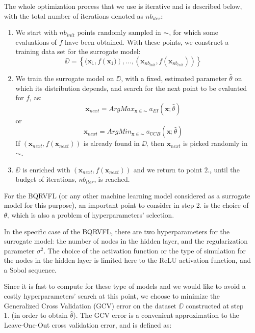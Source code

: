 \medskip 

The whole optimization process that we use is iterative and is described below, with the total number of iterations denoted as $nb_{iter}$: 

\begin{enumerate}
\item We start with $nb_{init}$ points randomly sampled in $\AC$, for which some evaluations of $f$ have been obtained. With these points, we construct a training data set for the surrogate model:
$$
\DD = \left \lbrace (\textbf{x}_1, f\left(\textbf{x}_1)\right), \ldots,  (\textbf{x}_{nb_{init}}, f(\textbf{x}_{nb_{init}}))\right \rbrace
$$
\item We train the surrogate model on $\DD$, with a fixed, estimated parameter $\hat{\theta}$ on which its distribution depends, and search for the next point to be evaluated for $f$, as: 
$$
\textbf{x}_{next} = ArgMax_{\textbf{x} \in \AC} \: a_{EI}(\textbf{x}; \hat{\theta})
$$ or 
$$
\textbf{x}_{next} = ArgMin_{\textbf{x} \in \AC} \: a_{UCB}(\textbf{x}; \hat{\theta})
$$
If $\left(\textbf{x}_{next}, f(\textbf{x}_{next})\right)$ is already found in $\DD$, then $\textbf{x}_{next}$ is picked randomly in $\AC$.
\item $\DD$ is enriched with $(\textbf{x}_{next}, f(\textbf{x}_{next}))$ and we return to point $2.$, until the budget of iterations, $nb_{iter}$, is reached.
\end{enumerate}

For the BQRVFL (or any other machine learning model considered as a surrogate model for this purpose), an important point to consider in step $2.$ is the choice of $\theta$, which is also a problem of hyperparameters' selection. 

In the specific case of the BQRVFL, there are two hyperparameters for the surrogate model: the number of nodes in the hidden layer, and the regularization parameter $\sigma^2$. The choice of the activation function or the type of simulation for the nodes in the hidden layer is limited here to the ReLU activation function, and a Sobol sequence. 

Since it is fast to compute for these type of models and we would like to avoid a costly hyperparameters' search at this point, we choose to minimize the Generalized Cross Validation (GCV) error on the dataset $\DD$ constructed at step $1.$ (in order to obtain $\hat{\theta}$). The GCV error is a convenient approximation to the Leave-One-Out cross validation error, and is defined as: 

